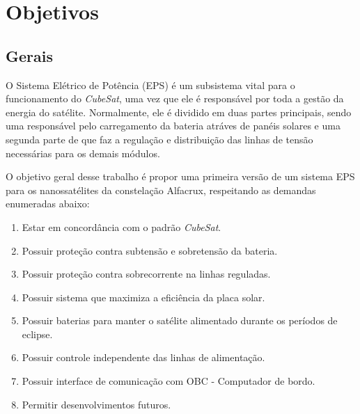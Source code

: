 
\section{Objetivos}
\subsection{Gerais}\label{gerais}


O Sistema Elétrico de Potência (EPS) é um subsistema vital para o funcionamento do \textit{CubeSat}, uma vez que ele é responsável por toda a gestão da energia do satélite. Normalmente, ele é dividido em duas partes principais, sendo uma responsável pelo carregamento da bateria atráves de panéis solares e uma segunda parte de que faz a regulação e distribuição das linhas de tensão necessárias para os demais módulos. 

O objetivo geral desse trabalho é propor uma primeira versão de um sistema EPS para os nanossatélites da constelação Alfacrux, respeitando as demandas enumeradas abaixo:

\begin{enumerate}
    \item Estar em concordância com o padrão \textit{CubeSat}.
    \item Possuir proteção contra subtensão e sobretensão da bateria.
    \item Possuir proteção contra sobrecorrente na linhas reguladas.
    \item Possuir sistema que maximiza a eficiência da placa solar.
    \item Possuir baterias para manter o satélite alimentado durante os períodos de eclipse.
    \item Possuir controle independente das linhas de alimentação.
    \item Possuir interface de comunicação com OBC - Computador de bordo.
    \item Permitir desenvolvimentos futuros.
\end{enumerate}{}


